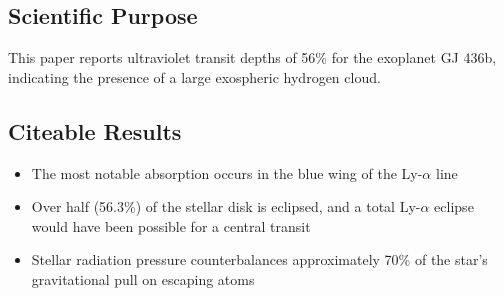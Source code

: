 \documentclass[onecolumn]{aastex63}
\begin{document}


\subsection{Scientific Purpose}
This paper reports ultraviolet transit depths of 56\% for the exoplanet GJ 436b, indicating the presence of a large exospheric hydrogen cloud.


\subsection{Citeable Results}
\begin{itemize}
    \item The most notable absorption occurs in the blue wing of the Ly-$\alpha$ line
    \item Over half (56.3\%) of the stellar disk is eclipsed, and a total Ly-$\alpha$ eclipse would have been possible for a central transit
    \item Stellar radiation pressure counterbalances approximately 70\% of the star's gravitational pull on escaping atoms
\end{itemize}



\end{document}
